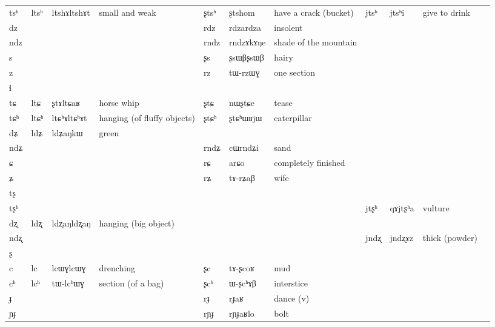 \documentclass[oldfontcommands,oneside,a4paper,11pt]{article}
\newcommand{\ipa}[1]{{\phon #1}} %
\newcommand{\tib}[1]{\cellcolor{lightgray}\textbf{#1}}
\newcommand{\idph}[1]{\cellcolor{gray}\textbf{#1}}
\begin{document}
\begin{table}
{\begin{tabular}{l|lll|lll|lll|l}
\ipa{tsʰ}   &	\ipa{ltsʰ} \idph{} &	\ipa{ltshɤltshɤt}  & small and weak	&	\ipa{ʂtsʰ}  &	\ipa{ʂtshom}  &	have a crack (bucket)&	\ipa{jtsʰ}  &	\ipa{jtsʰi}  &	give to drink&	\\
\ipa{dz}   &	  &	  &	&	\ipa{rdz} \idph{} &	\ipa{rdzardza}  &	insolent&	  &	  &	&	\\
\ipa{ndz}   &	  &	  &	&	\ipa{rndz}  &	\ipa{rndzɤkɤŋe}  &	 shade of the mountain&	  &	  &	&	\\
\ipa{s}   &	  &	  &	&	\ipa{ʂs}  \idph{} &	\ipa{ʂsɯβʂsɯβ}  &	hairy&	  &	  &	&	\\
\ipa{z}   &	  &	  &	&	\ipa{rz}  &	\ipa{tɯ-rzɯɣ}  &	one section&	  &	  &	&	\\
\ipa{ɬ}   &	  &	  &	&	  &	  &	&	  &	  &	&	\\
\ipa{tɕ}   &	\ipa{ltɕ} & \ipa{ʂtɤltɕaʁ}  &	horse whip  &	 	\ipa{ʂtɕ}  &	\ipa{nɯʂtɕe}  &tease	&	  &	  &	&	\\
\ipa{tɕʰ}   &	\ipa{ltɕʰ} \idph{} &	\ipa{ltɕʰɤltɕʰɤt}  &hanging (of fluffy objects)	&	\ipa{ʂtɕʰ}  &	\ipa{ʂtɕʰɯʁjɯ}  &caterpillar	&	  &	  &	&	\\
\ipa{dʑ}   &	\ipa{ldʑ}  \tib{} &	\ipa{ldʑaŋkɯ}  &	green&	  &	  &	&	  &	  &	&	\\
\ipa{ndʑ}   &	  &	  &	&	\ipa{rndʑ}  &	\ipa{cɯrndʑi}  &sand	&	  &	  &	&	\\
\ipa{ɕ}   &	  &	  &	&	\ipa{rɕ}  &	\ipa{arɕo}  &	completely finished&	  &	  &	&	\\
\ipa{ʑ}   &	  &	  &	&	\ipa{rʑ}  &	\ipa{tɤ-rʑaβ}  &wife	&	  &	  &	&	\\
\ipa{tʂ}   &	  &	  &	&	  &	  &	&	  &	  &	&	\\
\ipa{tʂʰ}   &	  &	  &	&	  &	  &	&	\ipa{jtʂʰ}  &	\ipa{qɤjtʂʰa}  &vulture	&	\\
\ipa{dʐ}   &	\ipa{ldʐ} \idph{}  &	\ipa{ldʐaŋldʐaŋ}  &	hanging (big object)&	  &	  &	&	  &	  &	&	\\
\ipa{ndʐ}   &	  &	  &	&	  &	  &	&	\ipa{jndʐ}  &	\ipa{jndʐɤz}  &thick (powder)	&	\\
\ipa{ʂ}   &	  &	  &	&	  &	  &	&	  &	  &	&	\\
\ipa{c}   &	\ipa{lc}  \idph{}&	\ipa{lcɯɣlcɯɣ}  &	drenching&	\ipa{ʂc}  &	\ipa{tɤ-ʂcoʁ}  &	mud&	  &	  &	&	\\
\ipa{cʰ}   &	\ipa{lcʰ}  &	\ipa{tɯ-lcʰɯɣ}  &	section (of a bag)&	\ipa{ʂcʰ}  &	\ipa{ɯ-ʂcʰɤβ}  &	interstice&	  &	  &	&	\\
\ipa{ɟ}   &	  &	  &	&	\ipa{rɟ}  &	\ipa{rɟaʁ}  &dance (v)	&	  &	  &	&	\\
\ipa{ɲɟ}   &	  &	  &	&	\ipa{rɲɟ}  &	\ipa{rɲɟaʁlo}  &	bolt&	  &	  &	&	\\

\end{tabular}}
\end{table}
\end{document}
